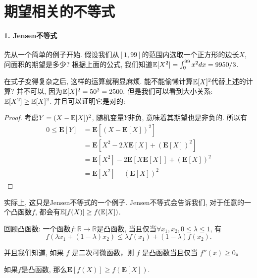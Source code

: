 \section{期望相关的不等式}

\paragraph{1. Jensen不等式} 先从一个简单的例子开始. 假设我们从$[1,99]$的范围内选取一个正方形的边长$X$, 问面积的期望是多少? 根据上面的公式, 我们知道$\mathbb E[X^2]= \int_{0}^{99} x^2 dx = 9950/3$. 

在式子变得复杂之后, 这样的运算就稍显麻烦. 能不能偷懒计算$\mathbb E[X]^2$代替上述的计算? 并不可以, 因为$\mathbb E[X]^2=50^2=2500.$ 但是我们可以看到大小关系: $\mathbb E[X^2]\geq \mathbb E[X]^2$. 并且可以证明它是对的: 
\begin{proof}
    考虑$Y=(X-\mathbb E[X])^2$, 随机变量$Y$非负, 意味着其期望也是非负的. 所以有
    $$
\begin{aligned}
0 \leq \mathbf{E}[Y] & =\mathbf{E}\left[(X-\mathbf{E}[X])^2\right] \\
& =\mathbf{E}\left[X^2-2 X \mathbf{E}[X]+(\mathbf{E}[X])^2\right] \\
& =\mathbf{E}\left[X^2\right]-2 \mathbf{E}[X \mathbf{E}[X]]+(\mathbf{E}[X])^2 \\
& =\mathbf{E}\left[X^2\right]-(\mathbf{E}[X])^2
\end{aligned}
$$
\end{proof}

实际上, 这只是Jensen不等式的一个例子. Jensen不等式会告诉我们, 对于任意的一个凸函数$f$, 都会有$\mathbb E[f(X)]\geq f(\mathbb E[X])$. 

\begin{asidebox}
回顾凸函数: 一个函数$f:\mathbb R \to \mathbb R$是凸函数, 当且仅当$\forall x_1, x_2, 0\leq \lambda \leq 1$, 有$$
f\left(\lambda x_1+(1-\lambda) x_2\right) \leq \lambda f\left(x_1\right)+(1-\lambda) f\left(x_2\right) .
$$

并且我们知道, 如果 $f$ 是二次可微函数，则 $f$ 是凸函数当且仅当 $f''(x)\geq 0$。
\end{asidebox}

\begin{theorem}
    如果$f$是凸函数, 那么$\mathbf{E}[f(X)] \geq f(\mathbf{E}[X])$. 
\end{theorem}

